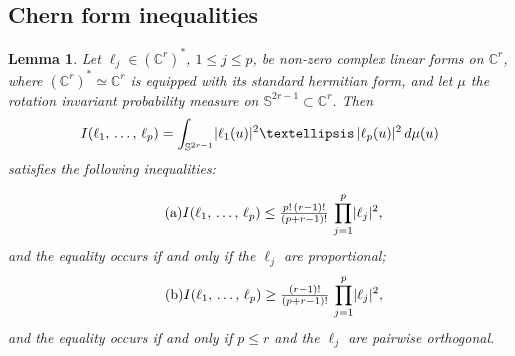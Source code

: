 \documentclass[10pt,a4paper]{amsart}
\numberwithin{equation}{section}
\DeclarePairedDelimiter{\abs}{\lvert}{\rvert}
\newenvironment{eqlist}{
\begingroup \leftskip\parindent \rightskip\parindent \noindent
\begin{minipage}{\linewidth-2\parindent}} {
\end{minipage}
\endgroup}
\newcommand*\bC{\mathbb{C}}
\newcommand*\bS{\mathbb{S}}
\let\leq\leqslant
\newtheorem{lemm}[theo]{Lemma}
\theoremstyle{definition}\newtheorem{defi}[theo]{Definition}
\theoremstyle{remark}\newtheorem{rema}[theo]{Remark}
\begin{document}
\subsection{Chern form inequalities}
\setcounter{theo}{4}
\begin{lemm}\label{lemm:Chern_form_inequalities}
Let $\ell_j\in(\bC^r)^*$, $1\leq j\leq p$, be non-zero complex linear forms on $\bC^r$, where $(\bC^r)^*\simeq\bC^r$ is equipped with its standard hermitian form, and let $\mu$ the rotation invariant probability measure on $\bS^{2r-1}\subset\bC^r$. Then
\[
I(\ell_1,\,\dotsc,\,\ell_p)=\int_{\bS^{2r-1}}\abs{\ell_1(u)}^2\ldots\,\abs{\ell_p(u)}^2\, d\mu(u)
\]
satisfies the following inequalities:\\
\begin{eqlist}
\[
\tag{a}\label{item:Chern_form_inequality1}
I(\ell_1,\,\dotsc,\,\ell_p)
\le
\tfrac{p!\,(r-1)!}{ (p+r-1)!}\,\prod_{j=1}^p\abs{\ell_j}^2,
\]
and the equality occurs if and only if the $\ell_j$ are proportional;
\[
\tag{b}\label{item:Chern_form_inequality2}
I(\ell_1,\,\dotsc,\,\ell_p)
\ge
\tfrac{(r-1)!}{ (p+r-1)!}\,\prod_{j=1}^p\abs{\ell_j}^2,
\]
and the equality occurs if and only if $p\leq r$ and the $\ell_j$ are pairwise orthogonal.
\end{eqlist}
\end{lemm}
\end{document}
